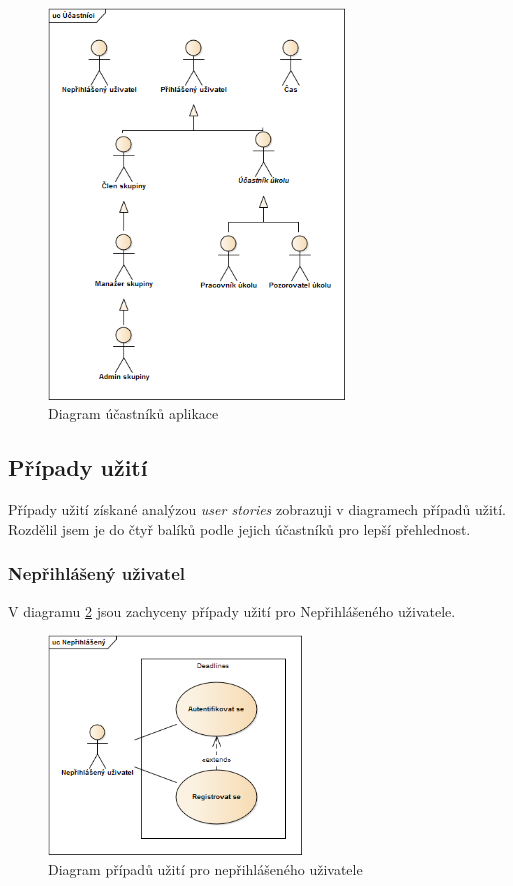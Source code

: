 \documentclass[thesis=B,czech]{FITthesis}[2012/06/26]
\begin{document}
			\begin{figure}\centering
				\includegraphics[width=0.7\textwidth]{ea-diagrams/uc-actors.png}
				\caption[Diagram účastníků]{Diagram účastníků aplikace}
				\label{diagram:actors}
			\end{figure}
			
			
			
		\subsection{Případy užití}
			\label{sec:usecases}
			Případy užití získané analýzou \textit{user stories} zobrazuji v diagramech případů užití. Rozdělil jsem je do čtyř balíků podle jejich účastníků pro lepší přehlednost.
			
			\subsubsection{Nepřihlášený uživatel}
			V diagramu \ref{diagram:uc-unauthorized} jsou zachyceny případy užití pro Nepřihlášeného uživatele.
			\begin{figure}\centering
				\includegraphics[width=0.6\textwidth]{ea-diagrams/uc-unauthorized.png}
				\caption[Případy užití nepřihlášených uživatelů]{Diagram případů užití pro nepřihlášeného uživatele}
				\label{diagram:uc-unauthorized}
			\end{figure}
			
\end{document}
